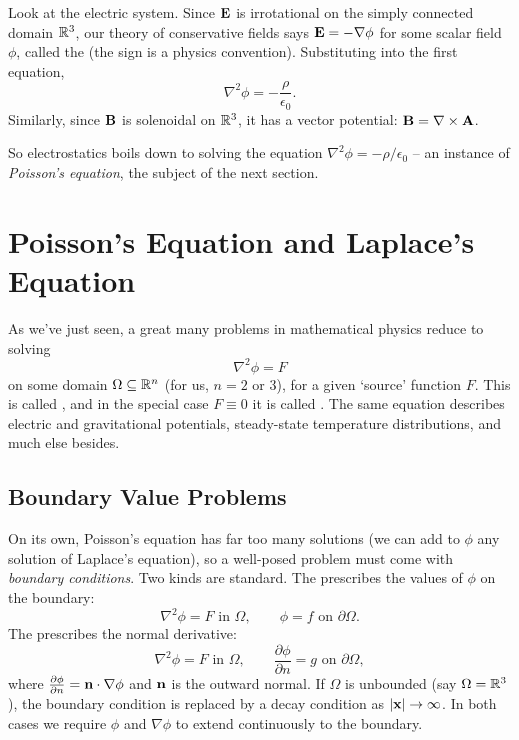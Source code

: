 \documentclass[a4paper]{scrartcl}
\begin{document}
Look at the electric system. Since $\mathbf{E}$ is irrotational on the simply connected domain $\mathbb{R}^3$, our theory of conservative fields says $\mathbf{E} = -\nabla \phi$ for some scalar field $\phi$, called the  (the sign is a physics convention). Substituting into the first equation,
$$
\nabla^2 \phi = -\frac{\rho}{\epsilon_0}.
$$
Similarly, since $\mathbf{B}$ is solenoidal on $\mathbb{R}^3$, it has a vector potential: $\mathbf{B} = \nabla \times \mathbf{A}$.

So electrostatics boils down to solving the equation $\nabla^2 \phi = -\rho/\epsilon_0$ -- an instance of \emph{Poisson's equation}, the subject of the next section.

\section{Poisson's Equation and Laplace's Equation}

As we've just seen, a great many problems in mathematical physics reduce to solving
$$
\nabla^2 \phi = F
$$
on some domain $\Omega \subseteq \mathbb{R}^n$ (for us, $n = 2$ or $3$), for a given `source' function $F$. This is called , and in the special case $F \equiv 0$ it is called . The same equation describes electric and gravitational potentials, steady-state temperature distributions, and much else besides.

\subsection{Boundary Value Problems}

On its own, Poisson's equation has far too many solutions (we can add to $\phi$ any solution of Laplace's equation), so a well-posed problem must come with \emph{boundary conditions}. Two kinds are standard. The  prescribes the values of $\phi$ on the boundary:
$$
\nabla^2 \phi = F \text{ in } \Omega, \quad \quad \phi = f \text{ on } \partial \Omega.
$$
The  prescribes the normal derivative:
$$
\nabla^2 \phi = F \text{ in } \Omega, \quad \quad \frac{\partial \phi}{\partial n} = g \text{ on } \partial \Omega,
$$
where $\frac{\partial \phi}{\partial n} = \mathbf{n} \cdot \nabla \phi$ and $\mathbf{n}$ is the outward normal. If $\Omega$ is unbounded (say $\Omega = \mathbb{R}^3$), the boundary condition is replaced by a decay condition as $|\mathbf{x}| \to \infty$. In both cases we require $\phi$ and $\nabla \phi$ to extend continuously to the boundary.
\end{document}
